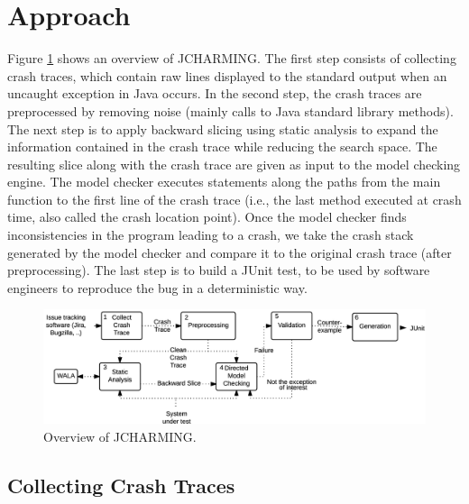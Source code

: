 \documentclass[12pt]{report}
\begin{document}
\section{\texorpdfstring{Approach\label{sec:jcharming}}{Approach}}\label{approach-4}

Figure \ref{fig:jcarming-approach} shows an overview of JCHARMING. The
first step consists of collecting crash traces, which contain raw lines
displayed to the standard output when an uncaught exception in Java
occurs. In the second step, the crash traces are preprocessed by
removing noise (mainly calls to Java standard library methods). The next
step is to apply backward slicing using static analysis to expand the
information contained in the crash trace while reducing the search
space. The resulting slice along with the crash trace are given as input
to the model checking engine. The model checker executes statements
along the paths from the main function to the first line of the crash
trace (i.e., the last method executed at crash time, also called the
crash location point). Once the model checker finds inconsistencies in
the program leading to a crash, we take the crash stack generated by the
model checker and compare it to the original crash trace (after
preprocessing). The last step is to build a JUnit test, to be used by
software engineers to reproduce the bug in a deterministic way.

\begin{figure}
  \centering
    \includegraphics[scale=0.9]{media/chap8/jcharming-approach.png}
    \caption{Overview of JCHARMING.
    \label{fig:jcarming-approach}}
\end{figure}

\subsection{Collecting Crash Traces}\label{collecting-crash-traces}
\end{document}
